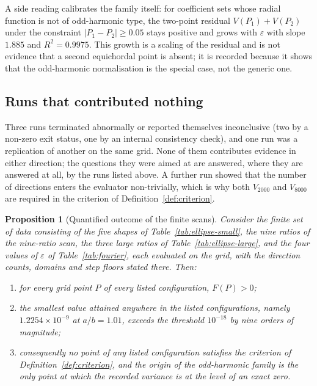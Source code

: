 \documentclass[11pt]{article}
\newtheorem{proposition}[theorem]{Proposition}
\theoremstyle{definition}
\theoremstyle{remark}
\begin{document}
{A side reading calibrates the family itself: for coefficient sets whose radial function is not of odd-harmonic type,
the two-point residual $V(P_1)+V(P_2)$ under the constraint $|P_1-P_2|\ge0.05$ stays positive and grows with
$\varepsilon$ with slope $1.885$ and $R^2=0.9975$. This growth is a scaling of the residual and is not evidence
that a second equichordal point is absent; it is recorded because it shows that the odd-harmonic normalisation is
the special case, not the generic one.

\subsection{Runs that contributed nothing}

Three runs terminated abnormally or reported themselves inconclusive (two by a non-zero exit status, one by an
internal consistency check), and one run was a replication of another on the same grid. None of them contributes
evidence in either direction; the questions they were aimed at are answered, where they are answered at all, by the
runs listed above. A further run showed that the number of directions enters the evaluator non-trivially, which is
why both $V_{2000}$ and $V_{8000}$ are required in the criterion of Definition~\ref{def:criterion}.

\begin{proposition}[Quantified outcome of the finite scans]\label{prop:finite-scan}
Consider the finite set of data consisting of the five shapes of Table~\ref{tab:ellipse-small}, the nine ratios
of the nine-ratio scan, the three large ratios of Table~\ref{tab:ellipse-large}, and the four values of
$\varepsilon$ of Table~\ref{tab:fourier}, each evaluated on the grid, with the direction counts, domains and step
floors stated there. Then:
\begin{enumerate}
\item[(i)] for every grid point $P$ of every listed configuration, $F(P)>0$;
\item[(ii)] the smallest value attained anywhere in the listed configurations, namely $1.2254\times10^{-9}$ at
$a/b=1.01$, exceeds the threshold $10^{-18}$ by nine orders of magnitude;
\item[(iii)] consequently no point of any listed configuration satisfies the criterion of
Definition~\ref{def:criterion}, and the origin of the odd-harmonic family is the only point at which the recorded
variance is at the level of an exact zero.
\end{enumerate}
\end{proposition}

}
\end{document}
